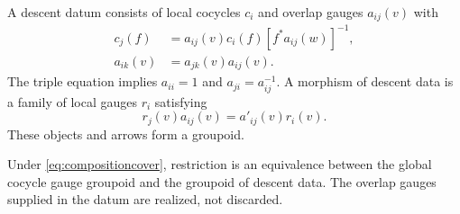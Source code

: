 A descent datum consists of local cocycles \(c_i\) and overlap gauges \(a_{ij}(v)\) with
\begin{align}
 c_j(f)&=a_{ij}(v)c_i(f)[f^*a_{ij}(w)]^{-1},\label{eq:localgauge}\\
 a_{ik}(v)&=a_{jk}(v)a_{ij}(v).\label{eq:triple}
\end{align}
The triple equation implies \(a_{ii}=1\) and \(a_{ji}=a_{ij}^{-1}\). A morphism of descent data is a family of local gauges \(r_i\) satisfying
\[
 r_j(v)a_{ij}(v)=a'_{ij}(v)r_i(v).
\]
These objects and arrows form a groupoid.

\begin{theorem}\label{KS34}
Under \eqref{eq:compositioncover}, restriction is an equivalence between the global cocycle gauge groupoid and the groupoid of descent data. The overlap gauges supplied in the datum are realized, not discarded.
\end{theorem}
